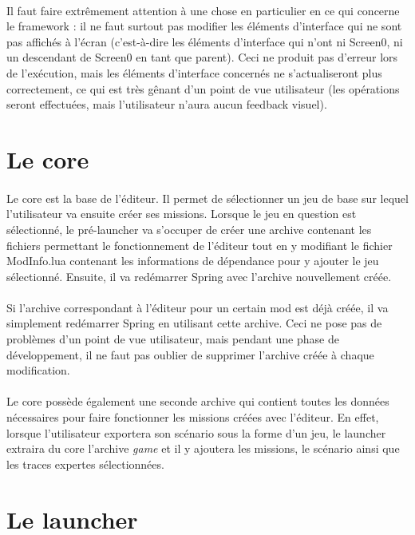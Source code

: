 \documentclass[a4paper]{article}
\begin{document}
\paragraph{}
Il faut faire extrêmement attention à une chose en particulier en ce qui concerne le framework : il ne faut surtout pas modifier les éléments d'interface qui ne sont pas affichés à l'écran (c'est-à-dire les éléments d'interface qui n'ont ni Screen0, ni un descendant de Screen0 en tant que parent). Ceci ne produit pas d'erreur lors de l'exécution, mais les éléments d'interface concernés ne s'actualiseront plus correctement, ce qui est très gênant d'un point de vue utilisateur (les opérations seront effectuées, mais l'utilisateur n'aura aucun feedback visuel).
\section{Le core}
\paragraph{}
Le core est la base de l'éditeur. Il permet de sélectionner un jeu de base sur lequel l'utilisateur va ensuite créer ses missions. Lorsque le jeu en question est sélectionné, le pré-launcher va s'occuper de créer une archive contenant les fichiers permettant le fonctionnement de l'éditeur tout en y modifiant le fichier ModInfo.lua contenant les informations de dépendance pour y ajouter le jeu sélectionné. Ensuite, il va redémarrer Spring avec l'archive nouvellement créée.
\paragraph{}
Si l'archive correspondant à l'éditeur pour un certain mod est déjà créée, il va simplement redémarrer Spring en utilisant cette archive. Ceci ne pose pas de problèmes d'un point de vue utilisateur, mais pendant une phase de développement, il ne faut pas oublier de supprimer l'archive créée à chaque modification.
\paragraph{}
Le core possède également une seconde archive qui contient toutes les données nécessaires pour faire fonctionner les missions créées avec l'éditeur. En effet, lorsque l'utilisateur exportera son scénario sous la forme d'un jeu, le launcher extraira du core l'archive \textit{game} et il y ajoutera les missions, le scénario ainsi que les traces expertes sélectionnées.
\section{Le launcher}
\end{document}
